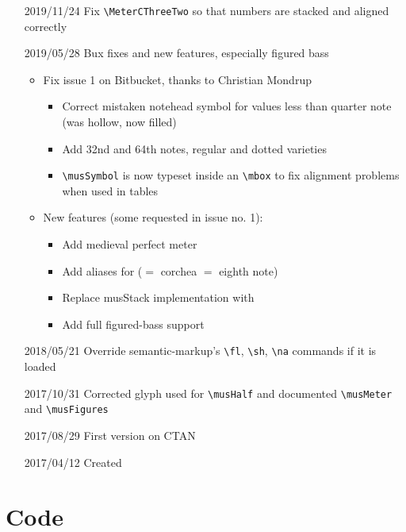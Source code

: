 \documentclass{article}
\begin{document}
\begin{itemize}
    \item[2019/11/24] Fix \verb|\MeterCThreeTwo| so that numbers are stacked
        and aligned correctly
    \item[2019/05/28] Bux fixes and new features, especially figured bass
        \begin{itemize}
            \item Fix issue 1 on Bitbucket, thanks to Christian Mondrup
                \begin{itemize}
                    \item Correct mistaken notehead symbol for values less than
                        quarter note (was hollow, now filled)
                    \item Add 32nd and 64th notes, regular and dotted varieties
                    \item \verb|\musSymbol| is now typeset inside an
                        \verb|\mbox| to fix alignment problems when used in
                        tables
                \end{itemize}
            \item New features (some requested in issue no. 1):
                \begin{itemize}
                    \item Add medieval perfect meter
                    \item Add aliases for  ($=$ corchea $=$ eighth note)
                    \item Replace musStack implementation with 
                    \item Add full figured-bass support
                \end{itemize}
        \end{itemize}
    \item[2018/05/21] Override semantic-markup's \verb|\fl|, \verb|\sh|,
        \verb|\na| commands if it is loaded
    \item[2017/10/31] Corrected glyph used for \verb|\musHalf| and documented
        \verb|\musMeter| and \verb|\musFigures|
    \item[2017/08/29] First version on CTAN
    \item[2017/04/12] Created
\end{itemize}

\section{Code}

\end{document}
